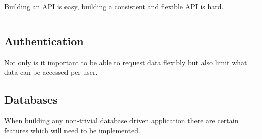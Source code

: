 \documentclass[
  12pt,
]{article}
\begin{document}
Building an API is easy, building a consistent and flexible API is hard.

\begin{center}\rule{0.5\linewidth}{\linethickness}\end{center}

\hypertarget{authentication}{%
\subsection{Authentication}\label{authentication}}

Not only is it important to be able to request data flexibly but also
limit what data can be accessed per user.

\hypertarget{databases}{%
\subsection{Databases}\label{databases}}

When building any non-trivial database driven application there are
certain features which will need to be implemented.
\end{document}

